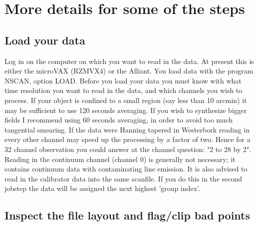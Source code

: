 \section{More details for some of the steps} 
\label{.detail} 


\subsection{Load your data} 
\label{.detail.load} 

Log in on the computer on which you want to read in the data. At present this
is either the microVAX (RZMVX4) or the Alliant. You load data with the program
NSCAN, option LOAD. Before you load your data you must know with what time
resolution you want to read in the data, and which channels you wish to
process. If your object is confined to a small region (say less than 10 arcmin)
it may be sufficient to use 120 seconds averaging. If you wish to synthesize
bigger fields I recommend using 60 seconds averaging, in order to avoid too
much tangential smearing. If the data were Hanning tapered in Westerbork
reading in every other channel may speed up the processing by a factor of two.
Hence for a 32 channel observation you could answer at the channel question: "2
to 28 by 2". Reading in the continuum channel (channel 0) is generally not
necessary; it contains continuum data with contaminating line emission. It is
also advised to read in the calibrator data into the same scanfile. If you do
this in the second jobstep the data will be assigned the next highest 'group
index'. 

\subsection{Inspect the file layout and flag/clip bad points} 
\label{.detail.inspdata} 

